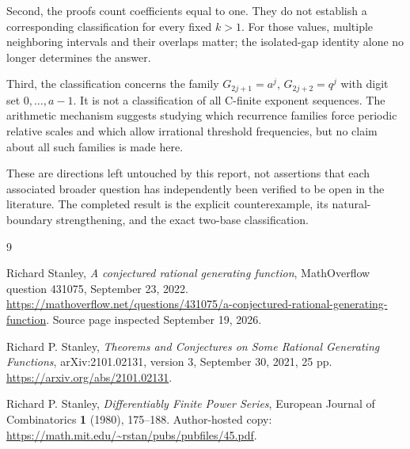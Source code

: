 \documentclass[11pt,letterpaper]{article}
\numberwithin{equation}{section}
\theoremstyle{definition}
\theoremstyle{remark}
\begin{document}
Second, the proofs count coefficients equal to one. They do not establish
a corresponding classification for every fixed $k>1$. For those values,
multiple neighboring intervals and their overlaps matter; the isolated-gap
identity alone no longer determines the answer.

Third, the classification concerns the family
$G_{2j+1}=a^j$, $G_{2j+2}=q^j$ with digit set $0,\ldots,a-1$.
It is not a classification of all C-finite exponent sequences.
The arithmetic mechanism suggests studying which recurrence families
force periodic relative scales and which allow irrational threshold
frequencies, but no claim about all such families is made here.

These are directions left untouched by this report, not assertions that
each associated broader question has independently been verified to be
open in the literature. The completed result is the explicit counterexample,
its natural-boundary strengthening, and the exact two-base classification.

\begin{thebibliography}{9}
\raggedright

Richard Stanley,
\emph{A conjectured rational generating function},
MathOverflow question 431075, September 23, 2022.
\url{https://mathoverflow.net/questions/431075/a-conjectured-rational-generating-function}.
Source page inspected September 19, 2026.

Richard P. Stanley,
\emph{Theorems and Conjectures on Some Rational Generating Functions},
arXiv:2101.02131, version 3, September 30, 2021, 25 pp.
\url{https://arxiv.org/abs/2101.02131}.

Richard P. Stanley,
\emph{Differentiably Finite Power Series},
European Journal of Combinatorics \textbf{1} (1980), 175--188.
Author-hosted copy:
\url{https://math.mit.edu/~rstan/pubs/pubfiles/45.pdf}.

\end{thebibliography}
\end{document}
